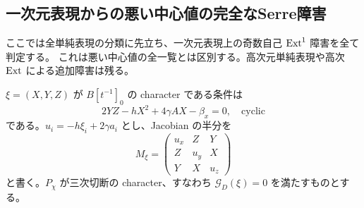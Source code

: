 \subsection{一次元表現からの悪い中心値の完全なSerre障害}
\label{subsec:character-serre-obstruction}
ここでは全単純表現の分類に先立ち、一次元表現上の奇数自己 $\operatorname{Ext}^1$ 障害を全て判定する。
これは悪い中心値の全一覧とは区別する。高次元単純表現や高次 $\operatorname{Ext}$ による追加障害は残る。

$\xi=(X,Y,Z)$ が $B[t^{-1}]_0$ の character である条件は
\[
 2YZ-hX^2+4\gamma AX-\beta_x=0,\quad\text{cyclic}
\]
である。$u_i=-h\xi_i+2\gamma a_i$ とし、Jacobian の半分を
\[
 M_\xi=\begin{pmatrix}u_x&Z&Y\\Z&u_y&X\\Y&X&u_z\end{pmatrix}
\]
と書く。$P_{\chi}$ が三次切断の character、すなわち
$\mathcal G_{D}(\xi)=0$ を満たすものとする。

